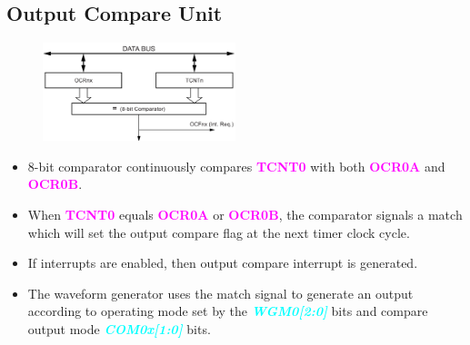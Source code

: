 \documentclass{article}
\newcommand{\bitFormat}[1]{\emph{\textbf{\textcolor{cyan}{#1}}}}
\newcommand{\regFormat}[1]{\textbf{\textcolor{magenta}{#1}}}
\begin{document}
\subsection{Output Compare Unit}
\begin{figure}[H]
    \begin{center}
        \includegraphics[width=0.5\textwidth]{Timer0CompareUnit.png}
    \end{center}
\end{figure}
\begin{itemize}
    \item 8-bit comparator continuously compares \regFormat{TCNT0} with both \regFormat{OCR0A} and \regFormat{OCR0B}.
    \item When \regFormat{TCNT0} equals \regFormat{OCR0A} or \regFormat{OCR0B}, the comparator signals a match which will set the output compare flag at the next timer clock cycle.
    \item If interrupts are enabled, then output compare interrupt is generated.
    \item The waveform generator uses the match signal to generate an output according to operating mode set by the \bitFormat{WGM0[2:0]} bits and compare output mode \bitFormat{COM0x[1:0]} bits.
\end{itemize}
\end{document}
